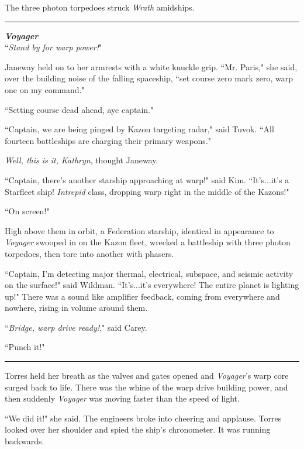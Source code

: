 \documentclass[twoside,letterpaper,12pt]{memoir}
\begin{document}
The three photon torpedoes struck \textit{Wrath} amidships.

\begin{center}\rule{3cm}{0.4 pt}\end{center}

\noindent\textit{\textbf{Voyager}}\\

``\textit{Stand by for warp power!}"

Janeway held on to her armrests with a white knuckle grip. ``Mr. Paris," she said, over the building noise of the falling spaceship, ``set course zero mark zero, warp one on my command."

``Setting course dead ahead, aye captain."

``Captain, we are being pinged by Kazon targeting radar," said Tuvok. ``All fourteen battleships are charging their primary weapons."

\textit{Well, this is it, Kathryn}, thought Janeway.

``Captain, there's another starship approaching at warp!" said Kim. ``It's...it's a Starfleet ship! \textit{Intrepid} class, dropping warp right in the middle of the Kazons!"

``On screen!"

High above them in orbit, a Federation starship, identical in appearance to \textit{Voyager} swooped in on the Kazon fleet, wrecked a battleship with three photon torpedoes, then tore into another with phasers.

``Captain, I'm detecting major thermal, electrical, subspace, and seismic activity on the surface!" said Wildman. ``It's...it's everywhere! The entire planet is lighting up!" There was a sound like amplifier feedback, coming from everywhere and nowhere, rising in volume around them.

``\textit{Bridge, warp drive ready!}," said Carey.

``Punch it!"

\begin{center}\rule{3cm}{0.4 pt}\end{center}

Torres held her breath as the valves and gates opened and \textit{Voyager}'s warp core surged back to life. There was the whine of the warp drive building power, and then suddenly \textit{Voyager} was moving faster than the speed of light.

``We did it!" she said. The engineers broke into cheering and applause. Torres looked over her shoulder and spied the ship's chronometer. It was running backwards.
\end{document}
